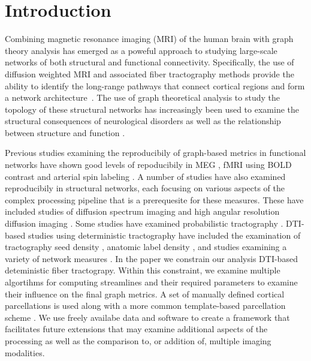 \documentclass{frontiersSCNS} %
\begin{document}
\section{Introduction}
Combining magnetic resonance imaging (MRI) of the human brain with graph
theory analysis has emerged as a poweful approach to studying
large-scale networks of both structural and functional
connectivity. Specifically, the use of diffusion weighted MRI and
associated fiber tractography methods provide the ability to identify
the long-range pathways that connect cortical regions and form a
network architecture~\citep{Basser2000,Lazar2003,Hagmann2003,Xue1999}. 
The use of graph theoretical analysis to study
the topology of these structural networks has increasingly been used to
examine the structural consequences of neurological disorders \citep{Xie2012}
as well as the relationship between structure and function \citep{}. 

Previous studies examining the reproducibily of graph-based metrics in
functional networks have shown good levels of repoducibily in MEG
\citep{Deuker2009}, fMRI using BOLD contrast
\citep{Telesford2010,Braun2012,Schwarz2011,Liang2012,Weber2013} and
arterial spin labeling \citep{Weber2013}. A number of studies have also examined
reproducibily in structural networks, each focusing on various aspects
of the complex processing pipeline that is a prerequesite for these
measures. These have included studies of diffusion spectrum imaging
\citep{Cammoun2012,Bassett2011N} and high angular resolution diffusion
imaging \citep{Dennis2012}. Some studies have examined probabilistic
tractography \citep{Owen2013BC,Vaessen2010}. DTI-based studies using
deterministic tractography have included the examination of
tractography seed density \citep{Cheng2012N}, anatomic label density
\citep{Bassett2011N}, and studies examining a variety of network
measures \citep{Cheng2012N,Irimia2012N}. In the paper we constrain our
analysis DTI-based deteministic fiber
tractograpy. Within this constraint, we examine multiple algortihms
for computing streamlines and their required parameters to examine
their influence on the final graph metrics. A set of manually defined
cortical parcellations \citep{Klein2012} is used along with a more common template-based
parcellation scheme \citep{AAL}. We use freely
availabe data and software to create a framework that facilitates future extensions
that may examine additional aspects of the processing as well as the
comparison to, or addition of, multiple imaging modalities. 
\end{document}
